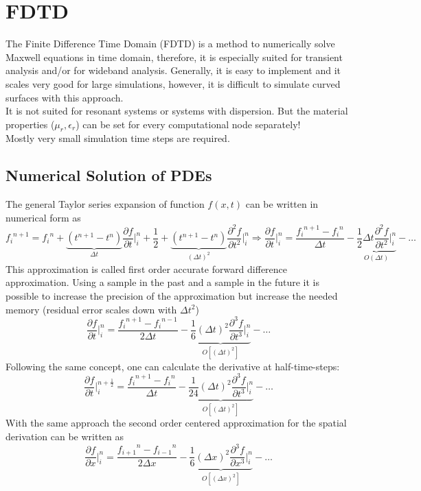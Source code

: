 \section{FDTD}
The Finite Difference Time Domain (FDTD) is a method to numerically solve Maxwell equations in time domain, therefore, it is especially suited for transient analysis and/or for wideband analysis. Generally, it is easy to implement and it scales very good for large simulations, however, it is difficult to simulate curved surfaces with this approach.\\
It is not suited for resonant systems or systems with dispersion. But the material properties ($\mu_r,\epsilon_r$) can be set for every computational node separately!\\ 
Mostly very small simulation time steps are required.

\subsection{Numerical Solution of PDEs}
The general Taylor series expansion of function $f(x,t)$ can be written in numerical form as 
\begin{equation*}
	{f_i}^{n+1}= {f_i}^n + \underbrace{\left(t^{n+1} - t^n\right)}_{\Delta t} \frac{\partial f}{\partial t} \bigg\rvert_{i}^{n} + \frac{1}{2} + \underbrace{\left(t^{n+1} - t^n\right)}_{\left(\Delta t\right)^2} \frac{\partial^2f}{\partial t^2} \bigg\rvert_{i}^{n} \Rightarrow \frac{\partial f}{\partial t} \bigg\rvert_{i}^{n} = \frac{{f_i}^{n+1}-{f_i}^n}{\Delta t} - \underbrace{\frac{1}{2}\Delta t \frac{\partial ^2 f}{\partial t^2}\bigg\rvert_{i}^{n}}_{O(\Delta t)} - \dots
\end{equation*}
This approximation is called first order accurate forward difference approximation. \newline Using a sample in the past and a sample in the future it is possible to increase the precision of the approximation but increase the needed memory (residual error scales down with $\Delta t^2$)
\begin{equation*}
	\frac{\partial f}{\partial t} \bigg\rvert_{i}^{n} = \frac{{f_i}^{n+1}-{f_i}^{n-1}}{2\Delta t} - \underbrace{\frac{1}{6}\left(\Delta t\right)^2 \frac{\partial ^3 f}{\partial t^3}\bigg\rvert_{i}^{n}}_{O\left[(\Delta t)^2\right]} - \dots
\end{equation*}
Following the same concept, one can calculate the derivative at half-time-steps:
\begin{equation*}
	\frac{\partial f}{\partial t} \bigg\rvert_{i}^{n+\frac{1}{2}} = \frac{{f_i}^{n+1}-{f_i}^{n}}{\Delta t} - \underbrace{\frac{1}{24}\left(\Delta t\right)^2 \frac{\partial ^3 f}{\partial t^3}\bigg\rvert_{i}^{n}}_{O\left[(\Delta t)^2\right]} - \dots
\end{equation*}
With the same approach the second order centered approximation for the spatial derivation can be written as
\begin{equation*}
	\frac{\partial f}{\partial x} \bigg\rvert_{i}^{n} = \frac{{f_{i+1}}^{n}-{f_{i-1}}^{n}}{2\Delta x} - \underbrace{\frac{1}{6}\left(\Delta x\right)^2 \frac{\partial ^3 f}{\partial x^3}\bigg\rvert_{i}^{n}}_{O\left[(\Delta x)^2\right]} - \dots
\end{equation*}

